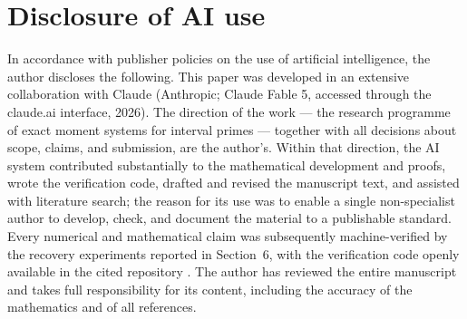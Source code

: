\documentclass[11pt]{article}
\theoremstyle{remark}
\begin{document}
\section*{Disclosure of AI use}

In accordance with publisher policies on the use of artificial intelligence, the author discloses the
following. This paper was developed in an extensive collaboration with Claude (Anthropic; Claude Fable
5, accessed through the claude.ai interface, 2026). The direction of the work --- the research
programme of exact moment systems for interval primes --- together
with all decisions about scope, claims, and submission, are the author's. Within that direction, the
AI system contributed substantially to the mathematical development and proofs, wrote the verification
code, drafted and revised the manuscript text, and assisted with literature search; the reason for its
use was to enable a single non-specialist author to develop, check, and document the material to a
publishable standard. Every numerical and mathematical claim was subsequently machine-verified by
the recovery experiments reported in Section~6, with the verification code openly available in the cited repository \cite{Code}. The author has
reviewed the entire manuscript and takes full responsibility for its content, including the accuracy
of the mathematics and of all references.
\end{document}
